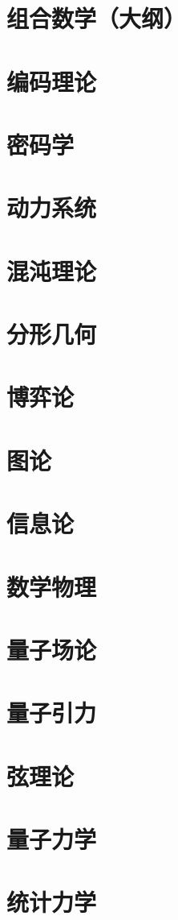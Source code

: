 \section{组合数学（大纲）}
\section{编码理论}
\section{密码学}
\section{动力系统}
\section{混沌理论}
\section{分形几何}
\section{博弈论}
\section{图论}
\section{信息论}
\section{数学物理}
\section{量子场论}
\section{量子引力}
\section{弦理论}
\section{量子力学}
\section{统计力学}
